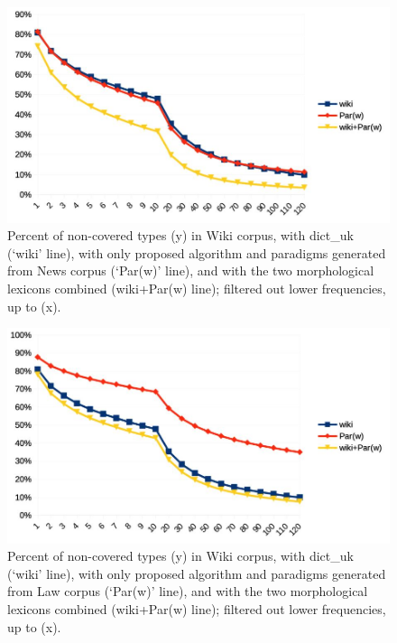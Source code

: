 \documentclass[11pt,a4paper]{article}
\begin{document}
\begin{figure}
	\includegraphics[width=\linewidth]{evaluation-coverage-wikiN.jpg}
	\caption{Percent of non-covered types (y) in Wiki corpus, with dict\_uk (`wiki' line), with only proposed algorithm and paradigms generated from News corpus (`Par(w)' line), and with the two morphological lexicons combined (wiki+Par(w) line); filtered out lower frequencies, up to (x).}
	\label{fig:pcNoTypWikiN}
\end{figure}

\begin{figure}
	\includegraphics[width=\linewidth]{evaluation-coverage-wikiL.jpg}
	\caption{Percent of non-covered types (y) in Wiki corpus, with dict\_uk (`wiki' line), with only proposed algorithm and paradigms generated from Law corpus (`Par(w)' line), and with the two morphological lexicons combined (wiki+Par(w) line); filtered out lower frequencies, up to (x).}
	\label{fig:pcNoTypWikiL}
\end{figure}
\end{document}
